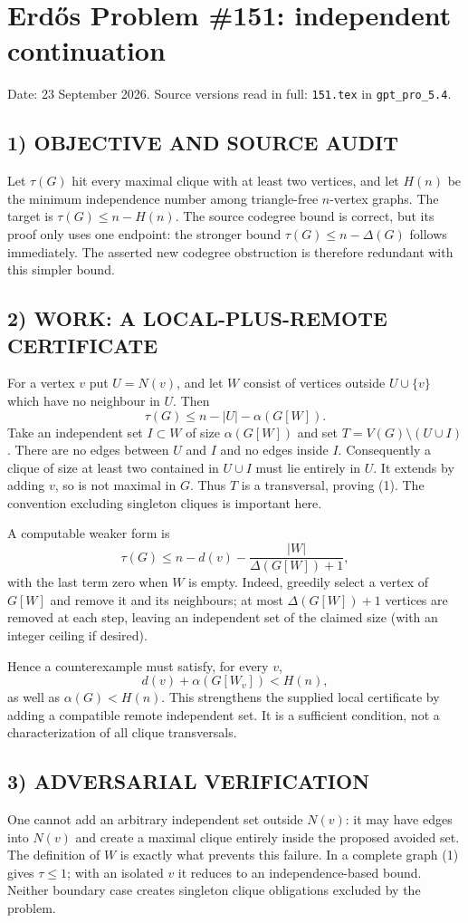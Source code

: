 \section{Erd\H{o}s Problem \#151: independent continuation}
\noindent Date: 23 September 2026. Source versions read in full: \texttt{151.tex} in \texttt{gpt\_pro\_5.4}.

\subsection*{1) OBJECTIVE AND SOURCE AUDIT}
Let $\tau(G)$ hit every maximal clique with at least two vertices, and let
$H(n)$ be the minimum independence number among triangle-free $n$-vertex
graphs. The target is $\tau(G)\le n-H(n)$.
The source codegree bound is correct, but its proof only uses one endpoint:
the stronger bound $\tau(G)\le n-\Delta(G)$ follows immediately. The asserted
new codegree obstruction is therefore redundant with this simpler bound.

\subsection*{2) WORK: A LOCAL-PLUS-REMOTE CERTIFICATE}
For a vertex $v$ put $U=N(v)$, and let $W$ consist of vertices outside
$U\cup\{v\}$ which have no neighbour in $U$. Then
\[
 \tau(G)\le n-|U|-\alpha(G[W]). \tag{1}
\]
Take an independent set $I\subset W$ of size $\alpha(G[W])$ and set
$T=V(G)\setminus(U\cup I)$. There are no edges between $U$ and $I$ and
no edges inside $I$. Consequently a clique of size at least two contained
in $U\cup I$ must lie entirely in $U$. It extends by adding $v$, so is
not maximal in $G$. Thus $T$ is a transversal, proving (1).
The convention excluding singleton cliques is important here.

A computable weaker form is
\[
 \tau(G)\le n-d(v)-\frac{|W|}{\Delta(G[W])+1},
\]
with the last term zero when $W$ is empty. Indeed, greedily select a vertex
of $G[W]$ and remove it and its neighbours; at most $\Delta(G[W])+1$
vertices are removed at each step, leaving an independent set of the
claimed size (with an integer ceiling if desired).

Hence a counterexample must satisfy, for every $v$,
\[
 d(v)+\alpha(G[W_v])<H(n),
\]
as well as $\alpha(G)<H(n)$. This strengthens the supplied local certificate
by adding a compatible remote independent set. It is a sufficient condition,
not a characterization of all clique transversals.

\subsection*{3) ADVERSARIAL VERIFICATION}
One cannot add an arbitrary independent set outside $N(v)$: it may have
edges into $N(v)$ and create a maximal clique entirely inside the proposed
avoided set. The definition of $W$ is exactly what prevents this failure.
In a complete graph (1) gives $\tau\le1$; with an isolated $v$ it reduces
to an independence-based bound. Neither boundary case creates singleton
clique obligations excluded by the problem.

